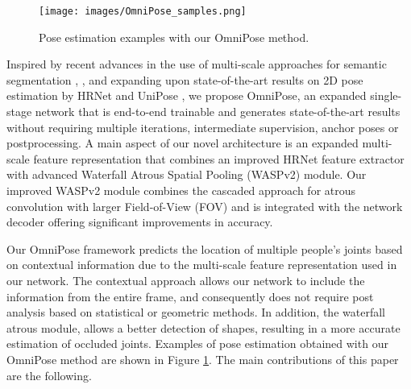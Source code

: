 \documentclass[10pt,twocolumn,letterpaper]{article}
\begin{document}
\begin{figure}[t]
\begin{center}
\texttt{[image: images/OmniPose\_samples.png]}
\end{center}
  \caption{Pose estimation examples with our OmniPose method.}
\label{fig:samples}
\end{figure}

Inspired by recent advances in the use of multi-scale approaches for semantic segmentation \cite{DeepLabv3}, \cite{DilatedConv}, and expanding upon state-of-the-art results
on 2D pose estimation by HRNet \cite{HRNet} and UniPose \cite{UniPose}, we propose OmniPose, an expanded single-stage network that is end-to-end trainable and generates state-of-the-art results without requiring multiple iterations, intermediate supervision, anchor poses or postprocessing.
A main aspect of our novel architecture is an expanded  multi-scale feature representation that combines an improved HRNet feature extractor with advanced Waterfall Atrous Spatial Pooling (WASPv2) module.
Our improved WASPv2 module combines the cascaded approach for atrous convolution with larger Field-of-View (FOV) and is integrated with the network decoder offering significant improvements in accuracy.

Our OmniPose framework predicts the location of multiple people's joints based on contextual information due to the multi-scale feature representation used in our network. The contextual approach allows our network to include the information from the entire frame, and consequently does not require post analysis based on statistical or geometric methods. In addition, the waterfall atrous module, allows a better detection of shapes, resulting in a more accurate estimation of occluded joints.
Examples of pose estimation obtained with our OmniPose method are shown in Figure \ref{fig:samples}.
The main contributions of this paper are the following.
\end{document}
